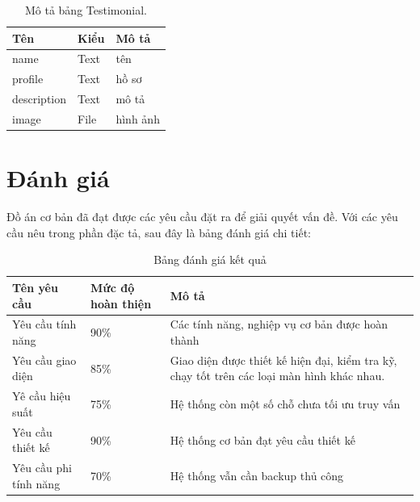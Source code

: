 \documentclass[11pt]{report}
\begin{document}
	
	\begin{table}[h!]
		\begin{center}
			\caption{Mô tả bảng Testimonial.}
			\begin{tabularx}{0.6\textwidth}{ |l|l|X| } 
				\hline
				Tên & Kiểu & Mô tả \\
				\hline
				name & Text & tên \\
				profile & Text & hồ sơ \\
				description & Text & mô tả \\
				image & File & hình ảnh \\ 
				\hline
			\end{tabularx}
			\label{table:Testimonial}
		\end{center}
	\end{table}
	
	
	
	
	
	
	\section{Đánh giá}

Đồ án cơ bản đã đạt được các yêu cầu đặt ra để giải quyết vấn đề. Với các yêu cầu nêu trong phần đặc tả, sau đây là bảng đánh giá chi tiết:

	\begin{table}[h!]
	\begin{center}
		\caption{Bảng đánh giá kết quả}
		\begin{tabularx}{0.8\textwidth}{ |l|l|X| } 
			\hline
			Tên yêu cầu & Mức độ hoàn thiện & Mô tả\\
			\hline
			Yêu cầu tính năng & 90\% & Các tính năng, nghiệp vụ cơ bản được hoàn thành\\
			Yêu cầu giao diện & 85\% & Giao diện được thiết kế hiện đại, kiểm tra kỹ, chạy tốt trên các loại màn hình khác nhau. \\
			Yê cầu hiệu suất & 75\% & Hệ thống còn một số chỗ chưa tối ưu truy vấn \\
			Yêu cầu thiết kế & 90\% & Hệ thống cơ bản đạt yêu cầu thiết kế \\
			Yêu cầu phi tính năng & 70\% & Hệ thống vẫn cần backup thủ công \\
			\hline
		\end{tabularx}

	\end{center}
\end{table}
\end{document}
